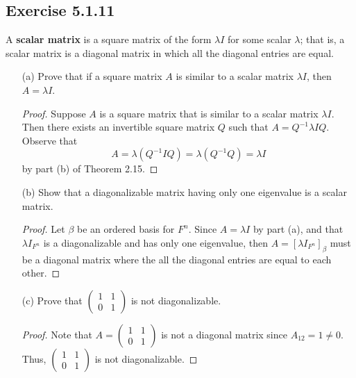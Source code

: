 \subsection*{Exercise 5.1.11} A \textbf{scalar matrix} is a square matrix of the form \( \lambda I  \) for some scalar \( \lambda  \); that is, a scalar matrix is a diagonal matrix in which all the diagonal entries are equal.
\begin{enumerate}
    \item[(a)] Prove that if a square matrix \( A  \) is similar to a scalar matrix \( \lambda I  \), then \( A = \lambda I  \).
        \begin{proof}
         Suppose \( A  \) is a square matrix that is similar to a scalar matrix \( \lambda I  \). Then there exists an invertible square matrix \( Q  \) such that \( A = Q^{-1} \lambda I Q  \). Observe that
         \[  A = \lambda (Q^{-1} I Q) = \lambda (Q^{-1}Q) = \lambda I \]
         by part (b) of Theorem 2.15.
        \end{proof}
    \item[(b)] Show that a diagonalizable matrix having only one eigenvalue is a scalar matrix.
        \begin{proof}
            Let \( \beta  \) be an ordered basis for \( F^{n} \). Since \( A = \lambda  I  \) by part (a), and that \( \lambda I_{F^{n}} \) is a diagonalizable and has only one eigenvalue, then \( A = [\lambda {I}_{F^{n}}]_{\beta}  \) must be a diagonal matrix where the all the diagonal entries are equal to each other. 
        \end{proof}
    \item[(c)] Prove that \( \begin{pmatrix} 
            1 & 1 \\
            0 & 1 
              \end{pmatrix}  \) is not diagonalizable.
            \begin{proof}
            Note that \( A = \begin{pmatrix} 
                1 & 1 \\
                0 & 1 
                      \end{pmatrix}  \) is not a diagonal matrix since \( {A}_{12} = 1 \neq  0  \). Thus, \( \begin{pmatrix} 
                1 & 1 \\
                0 & 1 
                                \end{pmatrix}  \) is not diagonalizable.
            \end{proof}
\end{enumerate}

